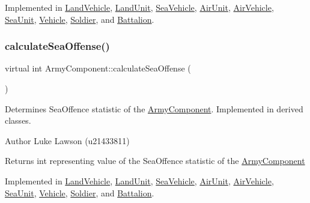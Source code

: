 Implemented in \mbox{\hyperlink{class_land_vehicle_a5a07a90d8307b0ac44e2caacb84eb64e}{Land\+Vehicle}}, \mbox{\hyperlink{class_land_unit_a5a0d88fe84b7700e9e85f6c3c1f1af9d}{Land\+Unit}}, \mbox{\hyperlink{class_sea_vehicle_aeca10ceffca2683364af15e67e666281}{Sea\+Vehicle}}, \mbox{\hyperlink{class_air_unit_ab7cd17470efa06d53df2ad5be3964e7a}{Air\+Unit}}, \mbox{\hyperlink{class_air_vehicle_a6a0912049937756912347a75cbd74c1b}{Air\+Vehicle}}, \mbox{\hyperlink{class_sea_unit_a04480810f175b4c0c7d5b54e9397605f}{Sea\+Unit}}, \mbox{\hyperlink{class_vehicle_a20e871b1ff13d47f4c875c987ed68add}{Vehicle}}, \mbox{\hyperlink{class_soldier_a6508d8539b427a9af01aabc07ba6ca8e}{Soldier}}, and \mbox{\hyperlink{class_battalion_a85b6a7096cce8ade372f1320bdc5949a}{Battalion}}.

\mbox{\label{class_army_component_a6e29f65ac92c18a82bf4a6a06d6d4457}} 
\subsubsection{\texorpdfstring{calculateSeaOffense()}{calculateSeaOffense()}}
{\footnotesize\ttfamily virtual int Army\+Component\+::calculate\+Sea\+Offense (\begin{DoxyParamCaption}{ }\end{DoxyParamCaption})\hspace{0.3cm}{\ttfamily [pure virtual]}}



Determines Sea\+Offence statistic of the \mbox{\hyperlink{class_army_component}{Army\+Component}}. Implemented in derived classes. 

\begin{DoxyAuthor}{Author}
Luke Lawson (u21433811) 
\end{DoxyAuthor}
\begin{DoxyReturn}{Returns}
int representing value of the Sea\+Offence statistic of the \mbox{\hyperlink{class_army_component}{Army\+Component}} 
\end{DoxyReturn}


Implemented in \mbox{\hyperlink{class_land_vehicle_a679b1e2f608cdfad427449240a504999}{Land\+Vehicle}}, \mbox{\hyperlink{class_land_unit_a40d93a3df8b92babc7a4f35a28dd3b73}{Land\+Unit}}, \mbox{\hyperlink{class_sea_vehicle_a0b7105037f612389b5af8471801ecee0}{Sea\+Vehicle}}, \mbox{\hyperlink{class_air_unit_a1e0b1b7905336477733191c6a66cf022}{Air\+Unit}}, \mbox{\hyperlink{class_air_vehicle_ad79fc5014baa403de34c435d3c2c14d0}{Air\+Vehicle}}, \mbox{\hyperlink{class_sea_unit_a3c275db4b9bf8cef62975d6c26ce79f8}{Sea\+Unit}}, \mbox{\hyperlink{class_vehicle_ab70b8c0eef30b37648a1ab9903043f47}{Vehicle}}, \mbox{\hyperlink{class_soldier_acdaf5453ea0f87b3219185b0a52dd869}{Soldier}}, and \mbox{\hyperlink{class_battalion_a589de99d9bcb79da2bd43303f272d079}{Battalion}}.

